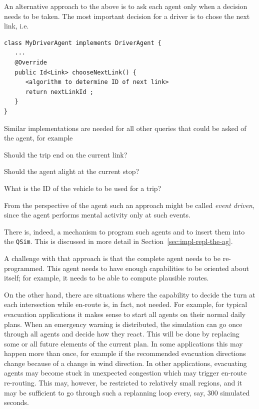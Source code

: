 An alternative approach to the above is to ask each agent only when a decision needs to be taken.  The most important decision for a driver is to chose the next link, i.e.
\begin{lstlisting}
class MyDriverAgent implements DriverAgent {
   ...
   @Override
   public Id<Link> chooseNextLink() {
      <algorithm to determine ID of next link>
      return nextLinkId ;
   }
}
\end{lstlisting}
Similar implementations are needed for all other queries that could be asked of the agent, for example
\begin{compactitem}

\item Should the trip end on the current link?

\item Should the agent alight at the current stop?

\item What is the ID of the vehicle to be used for a trip?

\end{compactitem}
From the perspective of the agent such an approach might be called \emph{event driven}, since the agent performs mental activity only at such events.

There is, indeed, a mechanism to program such agents and to insert
them into the \verb$QSim$.  This is discussed in more detail in
Section~\ref{sec:impl-repl-the-ag}.

A challenge with that approach is that the complete agent needs to be re-programmed.  This agent needs to have enough capabilities to be oriented about itself; for example, it needs to be able to compute plausible routes.

On the other hand, there are situations where the capability to decide the turn at each intersection while en-route is, in fact, not needed.  
%
For example, for typical evacuation applications it makes sense to start all agents on their normal daily plans.  When an emergency warning is distributed, the simulation can go once through all agents and decide how they react.  This will be done by replacing some or all future elements of the current plan.  In some applications this may happen more than once, for example if the recommended evacuation directions change because of a change in wind direction.  In other applications, evacuating agents may become stuck in unexpected congestion which may trigger en-route re-routing.  This may, however, be restricted to relatively small regions, and it may be sufficient to go through such a replanning loop every, say, 300 simulated seconds. 

